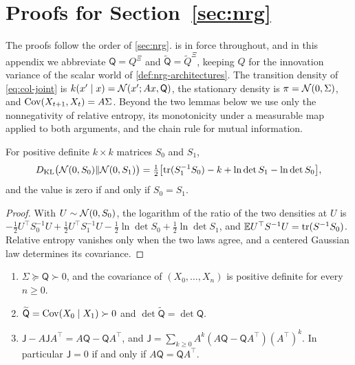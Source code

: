 \section{Proofs for \texorpdfstring{Section~\ref{sec:nrg}}{energetic viability}}\label{app:nrg}

The proofs follow the order of \cref{sec:nrg}.  is in force throughout, and in this appendix we abbreviate $\mathsf Q=Q^{\Xi}$ and $\widetilde{\mathsf Q}=\widetilde Q^{\Xi}$, keeping $Q$ for the innovation variance of the scalar world of \cref{def:nrg-architectures}. The transition density of \cref{eq:col-joint} is $k(x'\mid x)=\mathcal{N}(x';Ax,\mathsf Q)$, the stationary density is $\pi=\mathcal{N}(0,\Sigma)$, and $\operatorname{Cov}(X_{t+1},X_t)=A\Sigma$. Beyond the two lemmas below we use only the nonnegativity of relative entropy, its monotonicity under a measurable map applied to both arguments, and the chain rule for mutual information.

\begin{lemma}\label{lem:nrg-gauss}
For positive definite $k\times k$ matrices $S_0$ and $S_1$,
\[
D_{\mathrm{KL}}\bigl(\mathcal{N}(0,S_0)\Vert\mathcal{N}(0,S_1)\bigr)=\tfrac12\bigl[\operatorname{tr}(S_1^{-1}S_0)-k+\ln\det S_1-\ln\det S_0\bigr],
\]
and the value is zero if and only if $S_0=S_1$.
\end{lemma}

\begin{proof}
With $U\sim\mathcal{N}(0,S_0)$, the logarithm of the ratio of the two densities at $U$ is $-\tfrac12U^\top S_0^{-1}U+\tfrac12U^\top S_1^{-1}U-\tfrac12\ln\det S_0+\tfrac12\ln\det S_1$, and $\mathbb{E} U^\top S^{-1}U=\operatorname{tr}(S^{-1}S_0)$. Relative entropy vanishes only when the two laws agree, and a centered Gaussian law determines its covariance.
\end{proof}

\begin{lemma}\label{lem:nrg-facts}
\begin{enumerate}
\item[(i)] $\Sigma\succeq\mathsf Q\succ0$, and the covariance of $(X_0,\dots,X_n)$ is positive definite for every $n\ge0$.
\item[(ii)] $\widetilde{\mathsf Q}=\operatorname{Cov}(X_0\mid X_1)\succ0$ and $\det\widetilde{\mathsf Q}=\det\mathsf Q$.
\item[(iii)] $\mathsf J-A\mathsf JA^\top=A\mathsf Q-\mathsf QA^\top$, and $\mathsf J=\sum_{k\ge0}A^k(A\mathsf Q-\mathsf QA^\top)(A^\top)^k$. In particular $\mathsf J=0$ if and only if $A\mathsf Q=\mathsf QA^\top$.
\end{enumerate}
\end{lemma}

